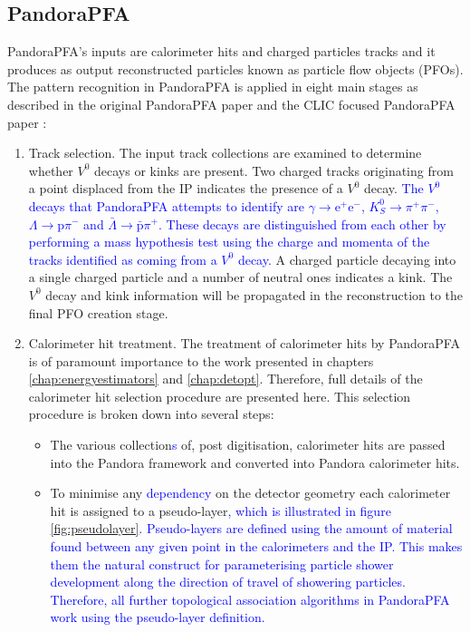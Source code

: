 \subsection{PandoraPFA}
PandoraPFA's inputs are calorimeter hits and charged particles tracks and it produces as output reconstructed particles known as particle flow objects (PFOs).  The pattern recognition in PandoraPFA is applied in eight main stages as described in the original PandoraPFA paper \cite{arXiv:0907.3577} and the CLIC focused PandoraPFA paper \cite{arXiv:1209.4039}:
\begin{enumerate}
\item Track selection.  The input track collections are examined to determine whether $V^{0}$ decays or kinks are present.  Two charged tracks originating from a point displaced from the IP indicates the presence of a $V^{0}$ decay.  \textcolor{blue}{The $V^{0}$ decays that PandoraPFA attempts to identify are $\gamma \rightarrow \text{e}^{+}\text{e}^{-}$, $K^{0}_{S} \rightarrow \pi^{+}\pi^{-}$, $\Lambda \rightarrow \text{p}\pi^{-}$ and $\bar{\Lambda} \rightarrow \bar{\text{p}}\pi^{+}$.  These decays are distinguished from each other by performing a mass hypothesis test using the charge and momenta of the tracks identified as coming from a $V^{0}$ decay.} A charged particle decaying into a single charged particle and a number of neutral ones indicates a kink.  The $V^{0}$ decay and kink information will be propagated in the reconstruction to the final PFO creation stage.  
\item Calorimeter hit treatment.  The treatment of calorimeter hits by PandoraPFA is of paramount importance to the work presented in chapters \ref{chap:energyestimators} and \ref{chap:detopt}.  Therefore, full details of the calorimeter hit selection procedure are presented here.  This selection procedure is broken down into several steps:
\begin{itemize}
\item The various collection\textcolor{blue}{s} of, post digitisation, calorimeter hits are passed into the Pandora framework and converted into Pandora calorimeter hits.  
\item To minimise any \textcolor{blue}{dependency} on the detector geometry each calorimeter hit is assigned to a pseudo-layer\textcolor{blue}{, which is illustrated in figure \ref{fig:pseudolayer}.  Pseudo-layers are defined using the amount of material found between any given point in the calorimeters and the IP.  This makes them the natural construct for parameterising particle shower development along the direction of travel of showering particles.  Therefore, all further topological association algorithms in PandoraPFA work using the pseudo-layer definition.}

\end{itemize}
\end{enumerate}

